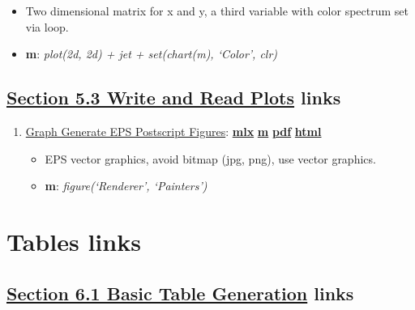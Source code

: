\documentclass[
]{book}
\providecommand{\tightlist}{%
  \setlength{\itemsep}{0pt}\setlength{\parskip}{0pt}}
\begin{document}
\begin{enumerate}
  \begin{itemize}
  \tightlist
  \item
    Two dimensional matrix for x and y, a third variable with color spectrum set via loop.
  \item
    \textbf{m}: \emph{plot(2d, 2d) + jet + set(chart(m), `Color', clr)}
  \end{itemize}
\end{enumerate}

\hypertarget{section-5.3-write-and-read-plotswrite-and-read-plots-links}{%
\subsection{\texorpdfstring{\protect\hyperlink{write-and-read-plots}{Section 5.3 Write and Read Plots} links}{Section 5.3 Write and Read Plots links}}\label{section-5.3-write-and-read-plotswrite-and-read-plots-links}}

\begin{enumerate}
\def\labelenumi{\arabic{enumi}.}
\tightlist
\item
  \href{https://fanwangecon.github.io/M4Econ/graph/export/htmlpdfm/fs_eps.html}{Graph Generate EPS Postscript Figures}: \href{https://github.com/FanWangEcon/M4Econ/blob/master/graph/export/fs_eps.mlx}{\textbf{mlx}} \textbar{} \href{https://github.com/FanWangEcon/M4Econ/blob/master/graph/export/htmlpdfm/fs_eps.m}{\textbf{m}} \textbar{} \href{https://github.com/FanWangEcon/M4Econ/blob/master/graph/export/htmlpdfm/fs_eps.pdf}{\textbf{pdf}} \textbar{} \href{https://fanwangecon.github.io/M4Econ/graph/export/htmlpdfm/fs_eps.html}{\textbf{html}}

  \begin{itemize}
  \tightlist
  \item
    EPS vector graphics, avoid bitmap (jpg, png), use vector graphics.
  \item
    \textbf{m}: \emph{figure(`Renderer', `Painters')}
  \end{itemize}
\end{enumerate}

\hypertarget{tables-links}{%
\section{Tables links}\label{tables-links}}

\hypertarget{section-6.1-basic-table-generationbasic-table-generation-links}{%
\subsection{\texorpdfstring{\protect\hyperlink{basic-table-generation}{Section 6.1 Basic Table Generation} links}{Section 6.1 Basic Table Generation links}}\label{section-6.1-basic-table-generationbasic-table-generation-links}}
\end{document}
